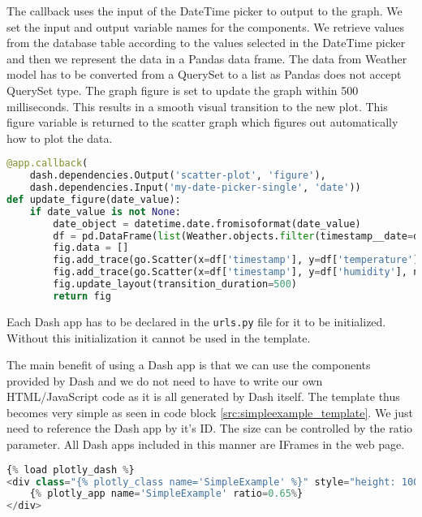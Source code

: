 The callback uses the input of the DateTime picker to output to the graph. We
set the input and output variable names for the components. We retrieve values
from the database table according to the values selected in the DateTime picker
and then we represent the data in a Pandas data frame. The data from Weather
model has to be converted from a QuerySet to a list as Pandas does not accept
QuerySet type. The graph figure is set to update the graph within 500
milliseconds. This results in a smooth visual transition to the new plot. This
figure variable is returned to the scatter graph which figures out automatically
how to plot the data.

\begin{lstlisting}[language={Python}]
@app.callback(
	dash.dependencies.Output('scatter-plot', 'figure'),
	dash.dependencies.Input('my-date-picker-single', 'date'))
def update_figure(date_value):
	if date_value is not None:
		date_object = datetime.date.fromisoformat(date_value)
		df = pd.DataFrame(list(Weather.objects.filter(timestamp__date=date_object).values('timestamp', 'temperature','humidity')))
		fig.data = []
		fig.add_trace(go.Scatter(x=df['timestamp'], y=df['temperature'], name="Temperature"),secondary_y=False,)
		fig.add_trace(go.Scatter(x=df['timestamp'], y=df['humidity'], name="Humidity"),	secondary_y=True,)
		fig.update_layout(transition_duration=500)
		return fig
\end{lstlisting}

\begin{note}
	Each Dash app has to be declared in the \texttt{urls.py} file for it to be initialized. Without this initialization it cannot be
	used in the template.
\end{note}

The main benefit of using a Dash app is that we can use the components provided by Dash and we do not need to have to write
our own HTML/JavaScript code as it is all generated by Dash itself. The template thus becomes very simple as seen in code 
block \ref{src:simpleexample_template}. We just need to reference the Dash app by it's ID. The size can be controlled by the ratio
parameter. All Dash apps included in this manner are IFrames in the web page.

\begin{lstlisting}[language={Python}]
{% load plotly_dash %}
<div class="{% plotly_class name='SimpleExample' %}" style="height: 100%; width: 100%">
	{% plotly_app name='SimpleExample' ratio=0.65%}
</div>
\end{lstlisting}

